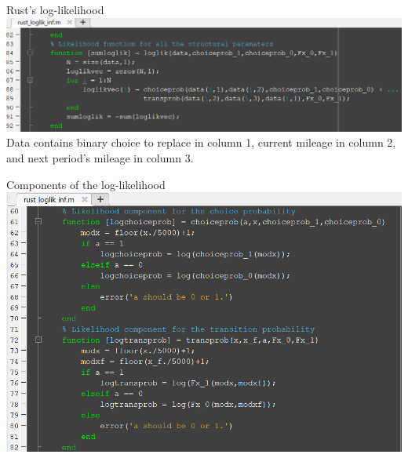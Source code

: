 \documentclass[aspectratio=169]{beamer}
\begin{document}
	\begin{frame}{Rust's log-likelihood}
		\includegraphics[width=\textwidth]{figs/4_loglik.PNG}\\
		
		\vspace{0.5cm}
		Data contains binary choice to replace in column 1, current mileage in column 2, and next period's mileage in column 3.
	\end{frame}
	
	\begin{frame}{Components of the log-likelihood}
		\includegraphics[width=\textwidth]{figs/5_loglik_components.PNG}
	\end{frame}
	
\end{document}

